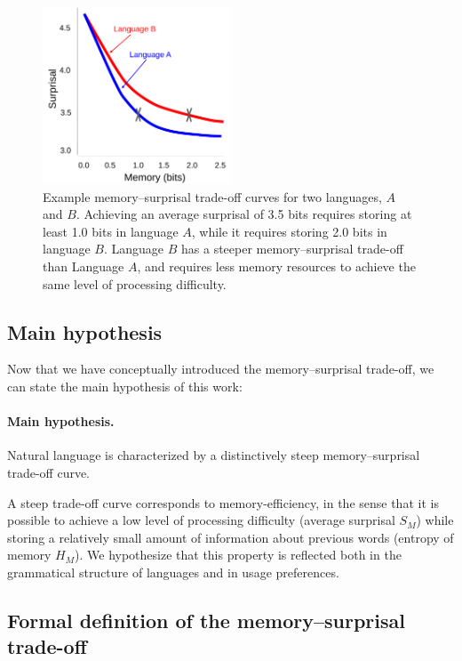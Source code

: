 \begin{figure}
\centering
\includegraphics[width=0.5\textwidth]{figures-gdrive/tradeoff-schematic.pdf}
\caption{Example memory--surprisal trade-off curves for two languages, $A$ and $B$. Achieving an average surprisal of 3.5 bits requires storing at least 1.0 bits in language $A$, while it requires storing 2.0 bits in language $B$. Language $B$ has a steeper memory--surprisal trade-off than Language $A$, and requires less memory resources to achieve the same level of processing difficulty.}
\label{fig:examples}
\end{figure}

\subsection{Main hypothesis}

Now that we have conceptually introduced the memory--surprisal trade-off, we can state the main hypothesis of this work:

\paragraph{Main hypothesis.}  Natural language is characterized by a distinctively steep memory--surprisal trade-off curve.

A steep trade-off curve corresponds to memory-efficiency, in the sense that it is possible to achieve a low level of processing difficulty (average surprisal $S_M$) while storing a relatively small amount of information about previous words (entropy of memory $H_M$).
We hypothesize that this property is reflected both in the grammatical structure of languages and in usage preferences.


\subsection{Formal definition of the memory--surprisal trade-off}
\label{sec:formal-tradeoff}

